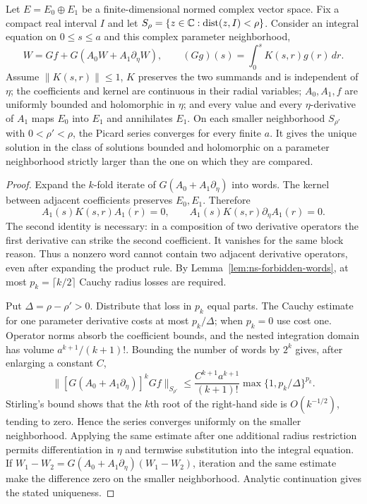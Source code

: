 \begin{proposition}
\label{prop:ns-sparse-volterra}
Let $E=E_0\oplus E_1$ be a finite-dimensional normed complex vector space.
Fix a compact real interval $I$ and let
$S_\rho=\{z\in\mathbb{C}:\operatorname{dist}(z,I)<\rho\}$. Consider an integral equation
on $0\leq s\leq a$ and this complex parameter neighborhood,
\[
 W=Gf+G(A_0W+A_1\partial_\eta W),\qquad
 (Gg)(s)=\int_0^s K(s,r)g(r)\,dr.
\]
Assume $\|K(s,r)\|\leq1$, $K$ preserves the two summands and is independent
of $\eta$; the coefficients and kernel are continuous in their radial
variables; $A_0,A_1,f$ are uniformly bounded and holomorphic in $\eta$;
and every value and every $\eta$-derivative of $A_1$ maps $E_0$ into $E_1$
and annihilates $E_1$. On each smaller neighborhood $S_{\rho'}$ with
$0<\rho'<\rho$, the Picard series converges for every finite $a$.
It gives the unique solution in the class of solutions bounded and
holomorphic on a parameter neighborhood strictly larger than the one
on which they are compared.
\end{proposition}
\begin{proof}
Expand the $k$-fold iterate of $G(A_0+A_1\partial_\eta)$ into words.
The kernel between adjacent coefficients preserves $E_0,E_1$. Therefore
\[
 A_1(s)K(s,r)A_1(r)=0,
 \qquad A_1(s)K(s,r)\partial_\eta A_1(r)=0.
\]
The second identity is necessary: in a composition of two derivative
operators the first derivative can strike the second coefficient. It
vanishes for the same block reason. Thus a nonzero word cannot contain
two adjacent derivative operators, even after expanding the product rule.
By Lemma~\ref{lem:ns-forbidden-words}, at most
$p_k=\lceil k/2\rceil$ Cauchy radius losses are required.

Put $\Delta=\rho-\rho'>0$. Distribute that loss in $p_k$ equal parts.
The Cauchy estimate for one parameter derivative costs at most
$p_k/\Delta$; when $p_k=0$ use cost one. Operator norms absorb the
coefficient bounds, and the nested integration domain has volume
$a^{k+1}/(k+1)!$. Bounding the number of words by $2^k$ gives, after
enlarging a constant $C$,
\[
 \bigl\|[G(A_0+A_1\partial_\eta)]^kGf\bigr\|_{S_{\rho'}}
 \leq\frac{C^{k+1}a^{k+1}}{(k+1)!}
       \max\{1,p_k/\Delta\}^{p_k}.
\]
Stirling's bound shows that the $k$th root of the right-hand side is
$O(k^{-1/2})$, tending to zero. Hence the series converges uniformly on
the smaller neighborhood. Applying the same estimate after one additional
radius restriction permits differentiation in $\eta$ and termwise
substitution into the integral equation. If $W_1-W_2=G(A_0+A_1\partial_\eta)
(W_1-W_2)$, iteration and the same estimate make the difference zero on
the smaller neighborhood. Analytic continuation gives the stated uniqueness.
\end{proof}

